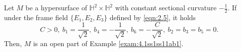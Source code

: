 \documentclass[10pt,a4paper]{amsart}
\begin{document}
\begin{theorem}\label{thm:4.1abc}
Let $M$ be a hypersurface of $\mathbb{H}^2\times \mathbb{H}^2$ with constant sectional curvature $-\frac{1}{2}$.
If under the frame field $\{E_1,E_2,E_3\}$ defined by \eqref{eqn:2.5}, it holds
$$
C>0,\ b_1=\frac{1}{\sqrt{2}},\ b_4=-\frac{1}{\sqrt{2}},\ b_6=-\frac{C}{\sqrt{2}},\ b_2=b_3=b_5=0.
$$
%
Then, $M$ is an open part of Example \ref{exam:4.1ss1ss11ab1}.
\end{theorem}
\end{document}
